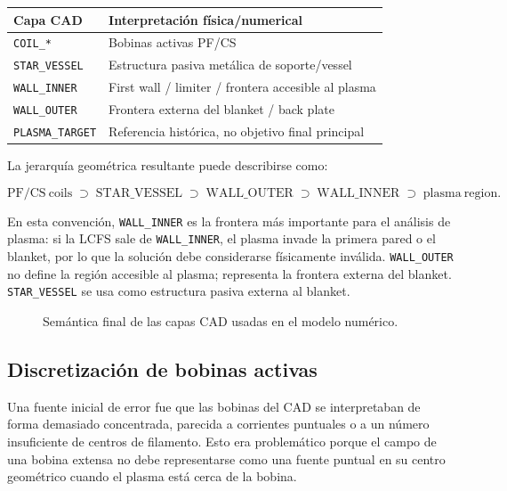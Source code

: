 \documentclass[11pt,a4paper]{article}
\begin{document}
\begin{center}
\begin{tabular}{ll}
\toprule
\textbf{Capa CAD} & \textbf{Interpretación física/numerical} \\
\midrule
\texttt{COIL\_*} & Bobinas activas PF/CS \\
\texttt{STAR\_VESSEL} & Estructura pasiva metálica de soporte/vessel \\
\texttt{WALL\_INNER} & First wall / limiter / frontera accesible al plasma \\
\texttt{WALL\_OUTER} & Frontera externa del blanket / back plate \\
\texttt{PLASMA\_TARGET} & Referencia histórica, no objetivo final principal \\
\bottomrule
\end{tabular}
\end{center}

La jerarquía geométrica resultante puede describirse como:

\[
\mathrm{PF/CS\ coils}\;\supset\;\mathrm{STAR\_VESSEL}\;\supset\;\mathrm{WALL\_OUTER}\;\supset\;\mathrm{WALL\_INNER}\;\supset\;\mathrm{plasma\ region}.
\]

En esta convención, \texttt{WALL\_INNER} es la frontera más importante para el análisis de
plasma: si la LCFS sale de \texttt{WALL\_INNER}, el plasma invade la primera pared o el blanket,
por lo que la solución debe considerarse físicamente inválida. \texttt{WALL\_OUTER} no define
la región accesible al plasma; representa la frontera externa del blanket. \texttt{STAR\_VESSEL}
se usa como estructura pasiva externa al blanket.

\begin{figure}[htbp]
\centering
{}
\caption{Semántica final de las capas CAD usadas en el modelo numérico.}
\label{fig:cad_semantics_final_placeholder}
\end{figure}

\subsection{Discretización de bobinas activas}
Una fuente inicial de error fue que las bobinas del CAD se interpretaban de forma demasiado
concentrada, parecida a corrientes puntuales o a un número insuficiente de centros de filamento.
Esto era problemático porque el campo de una bobina extensa no debe representarse como una
fuente puntual en su centro geométrico cuando el plasma está cerca de la bobina.
\end{document}
